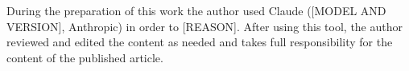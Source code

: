 During the preparation of this work the author used Claude ([MODEL AND VERSION], Anthropic) in order to [REASON]. %
After using this tool, the author reviewed and edited the content as needed and takes full responsibility for the content of the published article.
